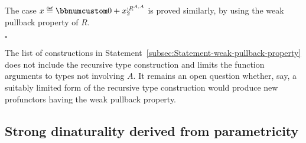 The case $x\triangleq\bbnum 0+x_{2}^{:R^{A,A}}$ is proved similarly,
by using the weak pullback property of $R$. %
\begin{comment}
\textbf{(f)} Rewrite the wedge relation for $x^{:S^{A,A,P^{A,A}}}$
and $y^{:S^{B,B,P^{B,B}}}$ by using the explicit liftings to $S$:
\[
x\triangleright f^{\uparrow S^{A,\bullet,P^{A,A}}}\bef\big(\overline{f^{\uparrow P^{A,\bullet}}}\big)^{\uparrow S^{A,B,\bullet}}=y\triangleright f^{\downarrow S^{\bullet,B,P^{B,B}}}\bef\big(\overline{f^{\downarrow P^{\bullet,B}}}\big)^{\uparrow S^{A,B,\bullet}}\quad.
\]
Due to the commutativity law of $S$, we may exchange the order of
compositions here:
\[
x\triangleright\big(\overline{f^{\uparrow P^{A,\bullet}}}\big)^{\uparrow S^{A,A,\bullet}}\triangleright f^{\uparrow S^{A,\bullet,P^{A,B}}}=y\triangleright\big(\overline{f^{\downarrow P^{\bullet,B}}}\big)^{\uparrow S^{B,B,\bullet}}\triangleright f^{\downarrow S^{\bullet,B,P^{A,B}}}\quad.
\]
Now we can use the weak pullback property of $S$ to obtain some $z:S^{B,A,P^{A,B}}$
such that
\[
x\triangleright\big(\overline{f^{\uparrow P^{A,\bullet}}}\big)^{\uparrow S^{A,A,\bullet}}=z\triangleright f^{\downarrow S^{\bullet,A,P^{A,B}}}\text{ and }y\triangleright\big(\overline{f^{\downarrow P^{\bullet,B}}}\big)^{\uparrow S^{B,B,\bullet}}=z\triangleright f^{\uparrow S^{B,\bullet,P^{A,B}}}\quad.
\]
We need to produce a value $t:S^{B,A,P^{B,A}}$ such that 
\[
x=t\triangleright f^{\downarrow S^{\bullet,A,P^{B,A}}}\bef\big(\overline{f^{\downarrow P^{\bullet,A}}}\big)^{\uparrow S^{A,A,\bullet}}\text{ and }y=t\triangleright f^{\uparrow S^{B,\bullet,P^{B,A}}}\bef\big(\overline{f^{\uparrow P^{B,\bullet}}}\big)^{\uparrow S^{B,B,\bullet}}\quad.
\]

{*}{*}{*}
\end{comment}
$\square$

The list of constructions in Statement~\ref{subsec:Statement-weak-pullback-property}
does not include the recursive type construction and limits the function
arguments to types not involving $A$. It remains an open question
whether, say, a suitably limited form of the recursive type construction
would produce new profunctors having the weak pullback property.

\subsection{Strong dinaturality derived from parametricity\label{subsec:Strong-dinaturality-derived-from-parametricity}}

